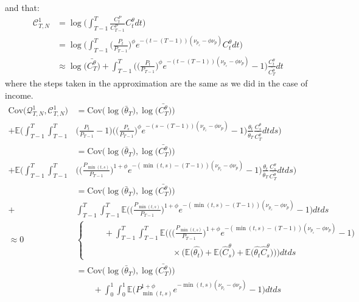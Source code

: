 and that:
\begin{align*}
\mathcal{C}^1_{T,N} &= \log \Bigg(  \int_{T-1}^{T} \frac{C^P_t}{C^P_{T-1}} C^{\theta}_t dt\Bigg) \\
&= \log \Bigg(  \int_{T-1}^{T} \Big(\frac{P_t}{P_{T-1}}\Big)^{\phi} e^{-(t-(T-1))(\nu_{p_c}-\phi \nu_p)} C^{\theta}_t dt\Bigg) \\
&\approx \log \Big( \bar{C^{\theta}_T} \Big) + \int_{T-1}^{T} \Big( \Big(\frac{P_t}{P_{T-1}}\Big)^{\phi}e^{-(t-(T-1))(\nu_{p_c}-\phi \nu_p)}-1\Big)\frac{C^{\theta}_t}{\bar{C^{\theta}_T}} dt 
\end{align*}
where the steps taken in the approximation are the same as we did in the case of income.
\begin{align*}
\mathrm{Cov}\Big(\mathcal{Q}^1_{T,N},\mathcal{C}^1_{T,N} \Big) 
&=\mathrm{Cov}\Big( \log \Big( \bar{\theta}_T \Big), \log \Big( \bar{C^{\theta}_T} \Big) \Big) \\
 + \mathbb{E} \Bigg(\int_{T-1}^{T} \int_{T-1}^{T}& \Big(\frac{P_t}{P_{T-1}}-1\Big)\Big( \Big(\frac{P_s}{P_{T-1}}\Big)^{\phi}e^{-(s-(T-1))(\nu_{p_c}-\phi \nu_p)}-1\Big)\frac{\theta_t}{\bar{\theta}_T} \frac{C^{\theta}_s}{\bar{C^{\theta}_T}} dt ds \Bigg) \\
&=\mathrm{Cov}\Big( \log \Big( \bar{\theta}_T \Big), \log \Big( \bar{C^{\theta}_T} \Big) \Big) \\
  + \mathbb{E}  \Bigg(\int_{T-1}^{T} \int_{T-1}^{T}& \Big( \Big(\frac{P_{\min(t,s)}}{P_{T-1}}\Big)^{1+\phi}e^{-(\min(t,s)-(T-1))(\nu_{p_c}-\phi \nu_p)}-1\Big)\frac{\theta_t}{\bar{\theta}_T} \frac{C^{\theta}_s}{\bar{C^{\theta}_T}} dt ds \Bigg) \\
&=\mathrm{Cov}\Big( \log \Big( \bar{\theta}_T \Big), \log \Big( \bar{C^{\theta}_T} \Big) \Big) \\
  + & \int_{T-1}^{T} \int_{T-1}^{T} \mathbb{E}\Big( \Big(\frac{P_{\min(t,s)}}{P_{T-1}}\Big)^{1+\phi}e^{-(\min(t,s)-(T-1))(\nu_{p_c}-\phi \nu_p)}-1\Big) dt ds  \\
 \approx 0 &
\begin{cases}
 \qquad +  \int_{T-1}^{T} \int_{T-1}^{T} \mathbb{E}\Bigg(\Big( \Big(\frac{P_{\min(t,s)}}{P_{T-1}}\Big)^{1+\phi}e^{-(\min(t,s)-(T-1))(\nu_{p_c}-\phi \nu_p)}-1\Big) \\
  \qquad \qquad \qquad \qquad \qquad  \times \Big(\mathbb{E}\Big(\hat{\theta_t}\Big)  + \mathbb{E}\Big(\hat{C}^{\theta}_s \Big) + \mathbb{E}\Big(\hat{\theta_t} \hat{C}^{\theta}_s\Big)\Big)\Bigg) dt ds 
 \end{cases} \\
 &= \mathrm{Cov}\Big( \log \Big( \bar{\theta}_T \Big), \log \Big( \bar{C^{\theta}_T} \Big) \Big) \\
 & \qquad +  \int_{0}^{1} \int_{0}^{1} \mathbb{E}\Big( P_{\min(t,s)}^{1+\phi}e^{-\min(t,s)(\nu_{p_c}-\phi \nu_p)}-1\Big) dt ds
\end{align*}
